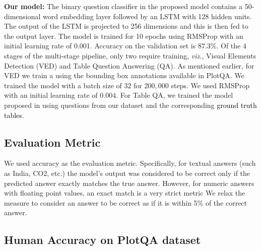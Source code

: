 \documentclass[10pt,twocolumn,letterpaper]{article}
\begin{document}
\noindent\textbf{Our model:}
The binary question classifier in the proposed model contains a 50-dimensional word embedding layer followed by an LSTM with 128 hidden units. The output of the LSTM is projected to 256 dimensions and this is then fed to the output layer. The model is trained for 10 epochs using RMSProp with an initial learning rate of 0.001. Accuracy on the validation set is $87.3\%$.
Of the 4 stages of the multi-stage pipeline, only two require training, \textit{viz.}, Visual Elements Detection (VED) and Table Question Answering (QA). 
As mentioned earlier, for VED we train a  using the bounding box annotations available in PlotQA. 
We trained the model with a batch size of 32 for $200,000$ steps. We used RMSProp with an initial learning rate of $0.004$. 
For Table QA, we trained the model proposed in \cite{PasupatL15} using questions from our dataset and the corresponding \textcolor{black}{ground truth tables}. 




\subsection{Evaluation Metric} We used accuracy as the evaluation metric. Specifically, for textual answers (such as India, CO2, etc.) the model's output was considered to be correct only if the predicted answer exactly matches the true answer. However, for numeric answers with floating point values, an exact match is a very strict metric 
We relax the measure to consider an answer to be correct as if it is within 5\% of the correct answer. 





\subsection{Human Accuracy on PlotQA dataset}
\end{document}

